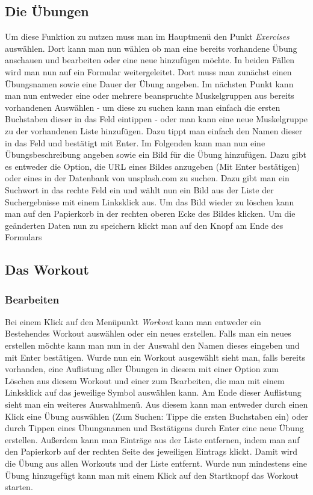 \documentclass[
	fontsize=11pt,
	]{article}
\begin{document}
\subsection{Die Übungen}
Um diese Funktion zu nutzen muss man im Hauptmenü den Punkt \textit{Exercises} auswählen. Dort kann man nun wählen ob man eine bereits vorhandene Übung anschauen und bearbeiten oder eine neue hinzufügen möchte. In beiden Fällen wird man nun auf ein Formular weitergeleitet. Dort muss man zunächst einen Übungsnamen sowie eine Dauer der Übung angeben. Im nächsten Punkt kann man nun entweder eine oder mehrere beanspruchte Muskelgruppen aus bereits vorhandenen Auswählen - um diese zu suchen kann man einfach die ersten Buchstaben dieser in das Feld eintippen - oder man kann eine neue Muskelgruppe zu der vorhandenen Liste hinzufügen. Dazu tippt man einfach den Namen dieser in das Feld und bestätigt mit Enter. Im Folgenden kann man nun eine Übungsbeschreibung angeben sowie ein Bild für die Übung hinzufügen. Dazu gibt es entweder die Option, die URL eines Bildes anzugeben (Mit Enter bestätigen) oder eines in der Datenbank von unsplash.com zu suchen. Dazu gibt man ein Suchwort in das rechte Feld ein und wählt nun ein Bild aus der Liste der Suchergebnisse mit einem Linksklick aus. Um das Bild wieder zu löschen kann man auf den Papierkorb in der rechten oberen Ecke des Bildes klicken. Um die geänderten Daten nun zu speichern klickt man auf den Knopf am Ende des Formulars
\subsection{Das Workout}
\subsubsection{Bearbeiten}
Bei einem Klick auf den Menüpunkt \textit{Workout} kann man entweder ein Bestehendes Workout auswählen oder ein neues erstellen. Falls man ein neues erstellen möchte kann man nun in der Auswahl den Namen dieses eingeben und mit Enter bestätigen. Wurde nun ein Workout ausgewählt sieht man, falls bereits vorhanden, eine Auflistung aller Übungen in diesem mit einer Option zum Löschen aus diesem Workout und einer zum Bearbeiten, die man mit einem Linksklick auf das jeweilige Symbol auswählen kann. Am Ende dieser Auflistung sieht man ein weiteres Auswahlmenü. Aus diesem kann man entweder durch einen Klick eine Übung auswählen (Zum Suchen: Tippe die ersten Buchstaben ein) oder durch Tippen eines Übungsnamen und Bestätigens durch Enter eine neue Übung erstellen. Außerdem kann man Einträge aus der Liste entfernen, indem man auf den Papierkorb auf der rechten Seite des jeweiligen Eintrags klickt. Damit wird die Übung aus allen Workouts und der Liste entfernt. Wurde nun mindestens eine Übung hinzugefügt kann man mit einem Klick auf den Startknopf das Workout starten.
\end{document}
